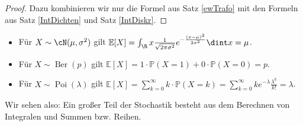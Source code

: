 \begin{proof}
	Dazu kombinieren wir nur die Formel aus Satz	\ref{ewTrafo} mit den Formeln aus Satz \ref{IntDichten} und Satz \ref{IntDiskr}.
\end{proof}

\begin{beispiel} \abs

	\begin{itemize}
		\item F\"ur $X \sim \cN(\mu, \sigma^2)$ gilt $ \mathbb{E}[X] = \int_{\R} x \frac{1}{\sqrt{2\pi\sigma^2}} e^{-\frac{(x-\mu)^2}{2 \sigma^2}}\dint x = \mu$.
		\item F\"ur $X \sim \operatorname{Ber}(p)$ gilt $ \mathbb{E}[X] = 1 \cdot \mathbb{P}(X = 1) + 0 \cdot \mathbb{P}(X = 0) = p$.
		\item F\"ur $X \sim \operatorname{Poi}(\lambda)$ gilt $ \mathbb{E}[X] = \sum_{k = 0}^{\infty} k \cdot \mathbb{P}(X = k) = \sum_{k = 0}^{\infty} k e^{-\lambda} \frac{\lambda^k}{k!} = \lambda$.
	\end{itemize}
	Wir sehen also: Ein gro\ss er Teil der Stochastik besteht aus dem Berechnen von Integralen und Summen bzw. Reihen.
\end{beispiel}
\marginpar{\textcolor{red}{Vorlesung 18}}

